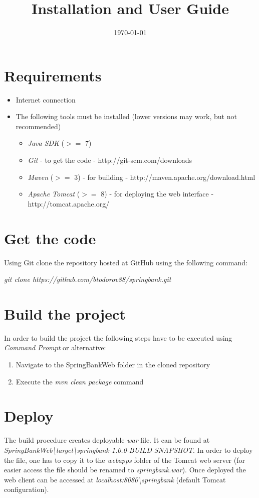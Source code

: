 \documentclass[a4paper, notitlepage]{article}
\begin{document}
\title{Installation and User Guide} 
\date{\today}
\maketitle



\section{Requirements}

\begin{itemize}
	\item Internet connection
	\item The following tools must be installed (lower versions may work, but not recommended)
	\begin{itemize}
		\item \textit{Java SDK} ($>=$ 7)
		\item \textit{Git} - to get the code - http://git-scm.com/downloads
		\item \textit{Maven} ($>=$ 3) - for building - http://maven.apache.org/download.html
		\item \textit{Apache Tomcat} ($>=$ 8) - for deploying the web interface - http://tomcat.apache.org/
	\end{itemize}
\end{itemize}

\section{Get the code}
Using Git clone the repository hosted at GitHub using the following command:

\textit{git clone https://github.com/btodorov88/springbank.git}

\section{Build the project}

In order to build the project the following steps have to be executed using \textit{Command Prompt} or alternative:
\begin{enumerate}
	\item Navigate to the SpringBankWeb folder in the cloned repository
	\item Execute the \textit{mvn clean package} command
\end{enumerate}

\section{Deploy}
The build procedure creates deployable \textit{war} file. It can be found at \textit{SpringBankWeb\textbackslash target\textbackslash springbank-1.0.0-BUILD-SNAPSHOT}. In order to deploy the file, one has to copy it to the \textit{webapps} folder of the Tomcat web server (for easier access the file should be renamed to \textit{springbank.war}). Once deployed the web client can be accessed at \textit{localhost:8080\textbackslash springbank} (default Tomcat configuration).
\end{document}
